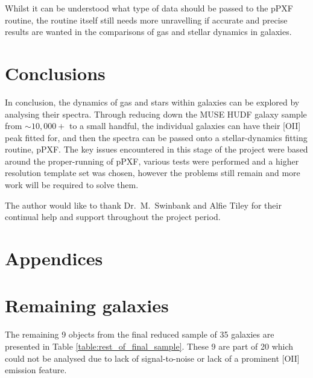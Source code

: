 \documentclass[12pt, twocolumn]{revtex4-1}    %
\begin{document}

Whilst it can be understood what type of data should be passed to the pPXF routine, the routine itself still needs more unravelling if accurate and precise results are wanted in the comparisons of gas and stellar dynamics in galaxies.


%

\section{Conclusions}
\noindent
In conclusion, the dynamics of gas and stars within galaxies can be explored by analysing their spectra. Through reducing down the MUSE HUDF galaxy sample from $\sim10,000+$ to a small handful, the individual galaxies can have their [OII] peak fitted for, and then the spectra can be passed onto a stellar-dynamics fitting routine, pPXF. The key issues encountered in this stage of the project were based around the proper-running of pPXF, various tests were performed and a higher resolution template set was chosen, however the problems still remain and more work will be required to solve them.

\begin{acknowledgments}
The author would like to thank Dr.~M.~Swinbank and Alfie Tiley for their continual help and support throughout the project period.
\end{acknowledgments}




\clearpage

\appendix

\onecolumngrid
\section*{Appendices}
\section{Remaining galaxies} \label{appendix:rest_of_final_sample}
\noindent
The remaining 9 objects from the final reduced sample of 35 galaxies are presented in Table \ref{table:rest_of_final_sample}. These 9 are part of 20 which could not be analysed due to lack of signal-to-noise or lack of a prominent [OII] emission feature.
\end{document}
